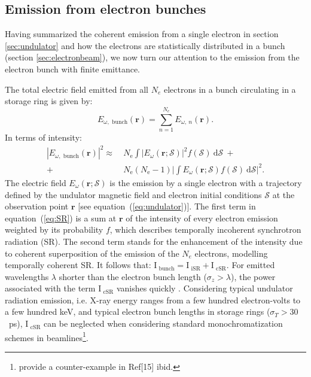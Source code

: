 \documentclass[preprint]{iucr}
\newcommand{\inred}[1]{{\color{red}#1}}
\begin{document}
\subsection{Emission from electron bunches}

Having summarized the coherent emission from a single electron in section \ref{sec:undulator} and how the electrons are statistically distributed in a bunch (section \ref{sec:electronbeam}), we now turn our attention to the emission from the electron bunch with finite emittance.

The total electric field emitted from all $N_e$ electrons in a bunch circulating in a storage ring is given by: 
\begin{equation}
    E_{\omega,\text{~bunch}}(\textbf{r}) = \sum_{n=1}^{N_e} E_{\omega,~n}(\textbf{r}).
\end{equation}
In terms of intensity: 
\begin{equation}
\begin{split}
|E_{\omega,\text{~bunch}}(\textbf{r})|^2 \approx ~&N_\text{e} \int\big| E_\omega(\textbf{r};\mathcal{S})\big|^2 f(\mathcal{S})~ \text{d}\mathcal{S}~+\\
+~ &N_\text{e}(N_\text{e}-1)\bigg| \int E_\omega(\textbf{r};\mathcal{S}) f(\mathcal{S})~ \text{d}\mathcal{S} \bigg|^2.
\end{split}
\label{eq:SR}
\end{equation}
The electric field $E_\omega(\textbf{r};\mathcal{S})$ is the emission by a single electron with \inred{a} trajectory defined by the undulator magnetic field and electron initial conditions $\mathcal{S}$
at the observation point $\textbf{r}$ [see equation~(\ref{eq:undulator})]. The first term in equation~(\ref{eq:SR}) is a sum at $\textbf{r}$ of the intensity of every electron emission weighted by its probability $f$, which describes temporally incoherent synchrotron radiation (SR). The second term stands for the enhancement of the intensity due to coherent superposition of the emission of the $N_e$ electrons, modelling temporally coherent SR. It follows that: $\text{I}_\text{~bunch} = \text{I}_\text{~iSR}+\text{I}_\text{~cSR}$.
For emitted wavelengths $\lambda$ shorter than the electron bunch length ($\sigma_z > \lambda$), the power associated with the term $\text{I}_\text{~cSR}$ vanishes quickly \cite{CSR,Wiedemann2015}. Considering typical undulator radiation emission, i.e. X-ray energy ranges from a few hundred electron-volts to a few hundred keV, and typical electron bunch lengths in storage rings ($\sigma_{T}>30$~ps), $\text{I}_\text{~cSR}$ can be neglected when considering standard monochromati\inred{z}ation schemes in beamlines\footnote{ provide a counter-example in Ref[15] ibid.}.
\end{document}
